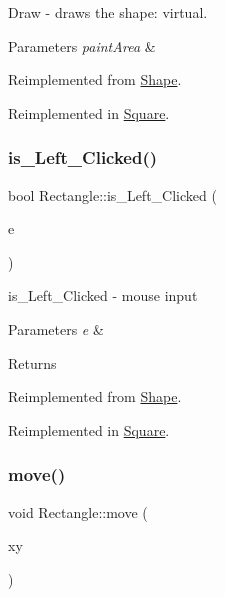 Draw -\/ draws the shape\+: virtual. 


\begin{DoxyParams}{Parameters}
{\em paint\+Area} & \\
\hline
\end{DoxyParams}


Reimplemented from \hyperlink{class_shape_ad7cc6a5e97b0971d50999bce4396127a}{Shape}.



Reimplemented in \hyperlink{class_square_a30b97f9d3fbd7d226a887ac157b827a0}{Square}.

\mbox{\label{class_rectangle_ade126ee824e394b9c38d2e67a30d1a7d}} 
\subsubsection{\texorpdfstring{is\+\_\+\+Left\+\_\+\+Clicked()}{is\_Left\_Clicked()}}
{\footnotesize\ttfamily bool Rectangle\+::is\+\_\+\+Left\+\_\+\+Clicked (\begin{DoxyParamCaption}\item[{Q\+Point}]{e }\end{DoxyParamCaption})\hspace{0.3cm}{\ttfamily [virtual]}}



is\+\_\+\+Left\+\_\+\+Clicked -\/ mouse input 


\begin{DoxyParams}{Parameters}
{\em e} & \\
\hline
\end{DoxyParams}
\begin{DoxyReturn}{Returns}

\end{DoxyReturn}


Reimplemented from \hyperlink{class_shape_ab2d47c913eb287843e61b2d48e422ced}{Shape}.



Reimplemented in \hyperlink{class_square_aaf0989a3dba67b2502f3a306e0136e69}{Square}.

\mbox{\label{class_rectangle_abeeafbc4d44bf241cf655e850f3ce3f3}} 
\subsubsection{\texorpdfstring{move()}{move()}}
{\footnotesize\ttfamily void Rectangle\+::move (\begin{DoxyParamCaption}\item[{Q\+Point}]{xy }\end{DoxyParamCaption})\hspace{0.3cm}{\ttfamily [virtual]}}



